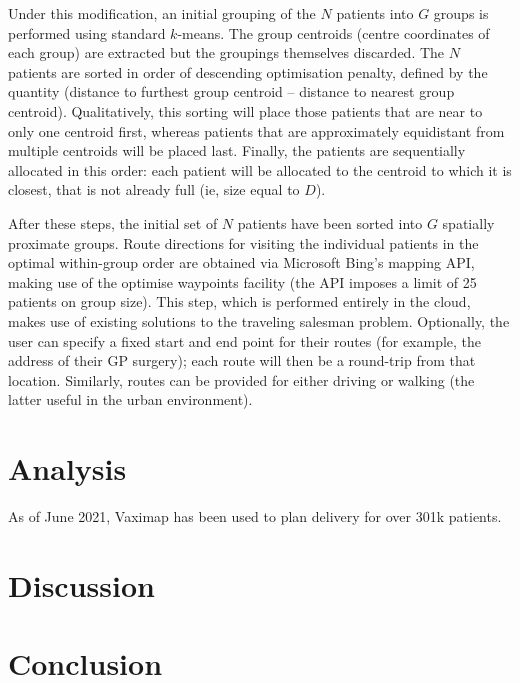 \documentclass[11pt]{amsart}
\begin{document}
Under this modification, an initial grouping of the $N$ patients into $G$ groups is performed using standard $k$-means. The group centroids (centre coordinates of each group) are extracted but the groupings themselves discarded. The $N$ patients are sorted in order of descending optimisation penalty, defined by the quantity (distance to furthest group centroid – distance to nearest group centroid). Qualitatively, this sorting will place those patients that are near to only one centroid first, whereas patients that are approximately equidistant from multiple centroids will be placed last. Finally, the patients are sequentially allocated in this order: each patient will be allocated to the centroid to which it is closest, that is not already full (ie, size equal to $D$). 

After these steps, the initial set of $N$ patients have been sorted into $G$ spatially proximate groups. Route directions for visiting the individual patients in the optimal within-group order are obtained via Microsoft Bing’s mapping API, making use of the optimise waypoints facility \cite{X} (the API imposes a limit of 25 patients on group size). This step, which is performed entirely in the cloud, makes use of existing solutions to the traveling salesman problem. Optionally, the user can specify a fixed start and end point for their routes (for example, the address of their GP surgery); each route will then be a round-trip from that location. Similarly, routes can be provided for either driving or walking (the latter useful in the urban environment). 

\section{Analysis}

As of June 2021, Vaximap has been used to plan delivery for over 301k patients. 

\section{Discussion}

\section{Conclusion}
\end{document}
